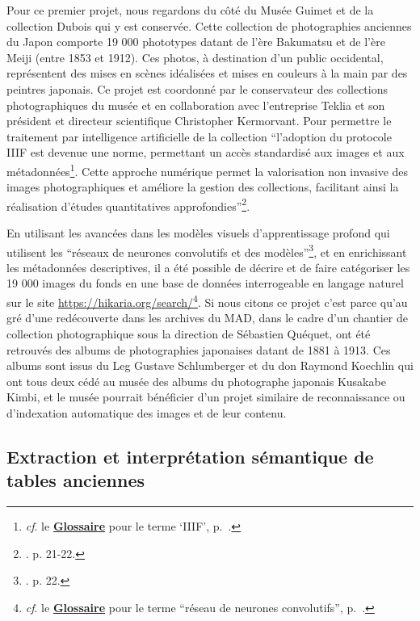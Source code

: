 Pour ce premier projet, nous regardons du côté du Musée Guimet et de la collection Dubois qui y est conservée. Cette collection de photographies anciennes du Japon comporte 19 000 phototypes datant de l'ère Bakumatsu et de l'ère Meiji (entre 1853 et 1912). Ces photos, à destination d'un public occidental, représentent des mises en scènes idéalisées et mises en couleurs à la main par des peintres japonais. Ce projet est coordonné par le conservateur des collections photographiques du musée et en collaboration avec l'entreprise Teklia et son président et directeur scientifique Christopher Kermorvant. Pour permettre le traitement par intelligence artificielle de la collection \enquote{l’adoption du protocole IIIF est devenue une norme, permettant un accès standardisé aux images et aux métadonnées\footnote{\textit{cf}. le \textbf{\hyperref[sec:Glossaire]{Glossaire}} pour le terme \enquote{IIIF}, p.~\pageref{sec:Glossaire}.}. Cette approche numérique permet la valorisation non invasive des images photographiques et améliore la gestion des collections, facilitant ainsi la réalisation d’études quantitatives approfondies}\footnote{\cite{saint-ours_de_projet_2024}. p. 21-22.}. 

En utilisant les avancées dans les modèles visuels d'apprentissage profond qui utilisent les \enquote{réseaux de neurones convolutifs et des modèles}\footnote{\cite{saint-ours_de_projet_2024}. p. 22.}, et en enrichissant les métadonnées descriptives, il a été possible de décrire et de faire catégoriser les 19 000 images du fonds en une base de données interrogeable en langage naturel sur le site \url{https://hikaria.org/search/}\footnote{\textit{cf}. le \textbf{\hyperref[sec:Glossaire]{Glossaire}} pour le terme \enquote{réseau de neurones convolutifs}, p.~\pageref{sec:Glossaire}.}. Si nous citons ce projet c'est parce qu'au gré d'une redécouverte dans les archives du MAD, dans le cadre d'un chantier de collection photographique sous la direction de Sébastien Quéquet, ont été retrouvés des albums de photographies japonaises datant de 1881 à 1913. Ces albums sont issus du Leg Gustave Schlumberger et du don Raymond Koechlin qui ont tous deux cédé au musée des albums du photographe japonais Kusakabe Kimbi, et le musée pourrait bénéficier d'un projet similaire de reconnaissance ou d'indexation automatique des images et de leur contenu. 

\subsection{Extraction et interprétation sémantique de tables anciennes}

